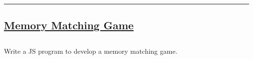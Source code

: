 \documentclass[12pt,letterpaper]{article}
\begin{document}
\hrule
\newpage

\subsection*{\underline{\textbf{Memory Matching Game}}}
\subsection*{}
\begin{flushleft}
    Write a JS program to develop a memory matching game.
\end{flushleft}

\subsection*{}
\subsubsection*{}
\begin{flushleft}

\end{flushleft}

\subsubsection*{{}}
\begin{flushleft}
    
\end{flushleft}

\subsubsection*{{}}
\begin{flushleft}
    
\end{flushleft}

\newpage
\end{document}
